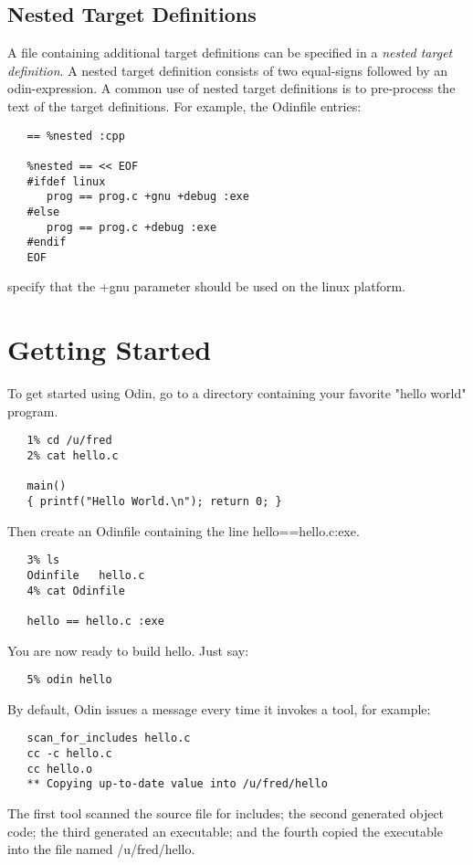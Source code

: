 \section{Nested Target Definitions}
\label{nestedtarget}

A file containing additional target definitions can be specified in a
{\em nested target definition}.
A nested target definition consists of two equal-signs followed by an
odin-expression.
A common use of nested target definitions is to pre-process the text
of the target definitions.
For example, the {\ex Odinfile} entries:
\begin{verbatim}
   == %nested :cpp

   %nested == << EOF
   #ifdef linux
      prog == prog.c +gnu +debug :exe
   #else
      prog == prog.c +debug :exe
   #endif
   EOF
\end{verbatim}
specify that the {\ex +gnu} parameter should be used
on the {\ex linux} platform.


\chapter{Getting Started}


To get started using Odin,
go to a directory containing your favorite "hello world" program.
\begin{verbatim}
   1% cd /u/fred
   2% cat hello.c

   main()
   { printf("Hello World.\n"); return 0; }
\end{verbatim}
Then create an {\ex Odinfile} containing the line {\ex hello==hello.c:exe}.
\begin{verbatim}
   3% ls
   Odinfile   hello.c
   4% cat Odinfile

   hello == hello.c :exe
\end{verbatim}
You are now ready to build {\ex hello}.  Just say:
\begin{verbatim}
   5% odin hello
\end{verbatim}
By default, Odin issues a message every time it invokes a tool, for example:
\begin{verbatim}
   scan_for_includes hello.c
   cc -c hello.c
   cc hello.o
   ** Copying up-to-date value into /u/fred/hello
\end{verbatim}
The first tool scanned the source file for includes; the second generated
object code; the third generated an executable; and the fourth copied the
executable into the file named {\ex /u/fred/hello}.

